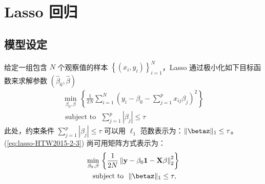 \section{Lasso 回归}


\subsection{模型设定} 

给定一组包含 $N$ 个观察值的样本 $\left\{\left(x_{i}, y_{i}\right)\right\}_{i=1}^{N}$，Lasso 通过极小化如下目标函数来求解参数  $(\widehat{\beta}_{0}, \widehat{\beta})$ 
\begin{equation}\label{eq:lasso-HTW2015-2-3}%
	\begin{gathered}
\underset{\beta_{0}, \beta}{\operatorname{min}}\,
	\left\{\frac{1}{2 N} \sum_{i=1}^{N}\left(y_{i}-\beta_{0}-\sum_{j=1}^{p} x_{i j} \beta_{j}\right)^{2}\right\} \\
	\text { subject to } \,\, \sum_{j=1}^{p}\left|\beta_{j}\right| \leq \tau
	\end{gathered}
\end{equation}
此处，约束条件 $\sum_{j=1}^{p}\left|\beta_{j}\right| \leq \tau$ 可以用 $\ell_{1}$ 范数表示为：$\|\betaz\|_{1} \leq \tau$。(\ref{eq:lasso-HTW2015-2-3}) 尚可用矩阵方式表示为：
\begin{equation}\label{eq:lasso-HTW2015-2-4}
\begin{gathered}
\underset{\beta_{0}, \beta}{\operatorname{min}}\,
\left\{\frac{1}{2 N}\left\|\mathbf{y}-\beta_{0} \mathbf{1}-\mathbf{X} \beta\right\|_{2}^{2}\right\} \\
\text { subject to }\,\,\|\betaz\|_{1} \leq \tau,
\end{gathered}
\end{equation}

